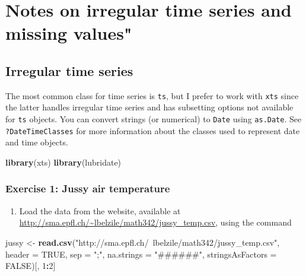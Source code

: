 \documentclass[]{book}
\newenvironment{Shaded}{\begin{snugshade}}{\end{snugshade}}
\newcommand{\DataTypeTok}[1]{\textcolor[rgb]{0.13,0.29,0.53}{#1}}
\newcommand{\DecValTok}[1]{\textcolor[rgb]{0.00,0.00,0.81}{#1}}
\newcommand{\KeywordTok}[1]{\textcolor[rgb]{0.13,0.29,0.53}{\textbf{#1}}}
\newcommand{\NormalTok}[1]{#1}
\newcommand{\OperatorTok}[1]{\textcolor[rgb]{0.81,0.36,0.00}{\textbf{#1}}}
\newcommand{\OtherTok}[1]{\textcolor[rgb]{0.56,0.35,0.01}{#1}}
\newcommand{\StringTok}[1]{\textcolor[rgb]{0.31,0.60,0.02}{#1}}
\providecommand{\tightlist}{%
  \setlength{\itemsep}{0pt}\setlength{\parskip}{0pt}}
\begin{document}
\hypertarget{notes-on-irregular-time-series-and-missing-values}{%
\chapter{Notes on irregular time series and missing values"}\label{notes-on-irregular-time-series-and-missing-values}}

\hypertarget{irregular-time-series}{%
\section{Irregular time series}\label{irregular-time-series}}

The most common class for time series is \texttt{ts}, but I prefer to work with \texttt{xts} since the latter handles irregular time series and has subsetting options not available for \texttt{ts} objects. You can convert strings (or numerical) to \texttt{Date} using \texttt{as.Date}. See \texttt{?DateTimeClasses} for more information about the classes used to represent date and time objects.

\begin{Shaded}
\begin{Highlighting}[]
\KeywordTok{library}\NormalTok{(xts)}
\KeywordTok{library}\NormalTok{(lubridate)}
\end{Highlighting}
\end{Shaded}

\hypertarget{exercise-1-jussy-air-temperature}{%
\subsection{Exercise 1: Jussy air temperature}\label{exercise-1-jussy-air-temperature}}

\begin{enumerate}
\def\labelenumi{\arabic{enumi}.}
\tightlist
\item
  Load the data from the website, available at \url{http://sma.epfl.ch/~lbelzile/math342/jussy_temp.csv}, using the command
\end{enumerate}

\begin{Shaded}
\begin{Highlighting}[]
\NormalTok{jussy <-}\StringTok{ }\KeywordTok{read.csv}\NormalTok{(}\StringTok{"http://sma.epfl.ch/~lbelzile/math342/jussy_temp.csv"}\NormalTok{, }\DataTypeTok{header =} \OtherTok{TRUE}\NormalTok{, }
    \DataTypeTok{sep =} \StringTok{";"}\NormalTok{, }\DataTypeTok{na.strings =} \StringTok{"######"}\NormalTok{, }\DataTypeTok{stringsAsFactors =} \OtherTok{FALSE}\NormalTok{)[, }\DecValTok{1}\OperatorTok{:}\DecValTok{2}\NormalTok{]}
\end{Highlighting}
\end{Shaded}
\end{document}
